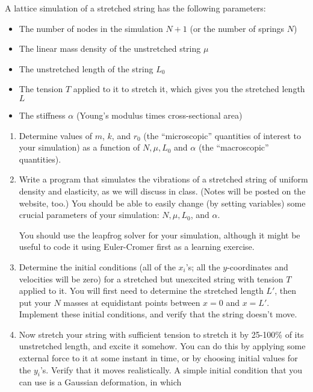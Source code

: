 \documentclass[12pt]{article}
\begin{document}
  
  A lattice simulation of a stretched string has the following parameters:
    \begin{itemize}
      \item{The number of nodes in the simulation $N+1$ (or the number of springs $N$)}
        \item{The linear mass density of the unstretched string $\mu$}
        \item{The unstretched length of the string $L_0$}
        \item{The tension $T$ applied to it to stretch it, which gives you the stretched length $L$}
        \item{The stiffness $\alpha$ (Young's modulus times cross-sectional area)}
      \end{itemize}

\begin{enumerate}

  \item{Determine values of $m$, $k$, and $r_0$ (the ``microscopic'' quantities of interest to your simulation) as a function of $N, \mu, L_0$ and $\alpha$ (the ``macroscopic'' quantities).}

  \item{Write a program that simulates the vibrations of a stretched string of uniform density and elasticity, as we will discuss in class. (Notes will be posted on the website, too.)
      You should be able to easily change (by setting variables) some crucial parameters of your simulation: $N, \mu, L_0$, and $\alpha$.

      You should use the leapfrog solver for your simulation, although it might be useful to code it using Euler-Cromer first as a learning exercise.

    }

  \item{Determine the initial conditions (all of the $x_i$'s; all the $y$-coordinates and velocities will be zero) for a stretched but unexcited string with tension $T$ applied to it. You will first need to determine the stretched length $L'$, then put your $N$
    masses at equidistant points between $x=0$ and $x=L'$. Implement these initial conditions, and verify that the string doesn't move.} 

  \item{Now stretch your string with sufficient tension to stretch it by 25-100\% of its unstretched length, and excite it somehow. You can do this by applying some external force to it at some instant in time, or by choosing initial values for the $y_i$'s.
    Verify that it moves realistically. A simple initial condition that you can use is a Gaussian deformation, in which 

}
\end{enumerate}
\end{document}
